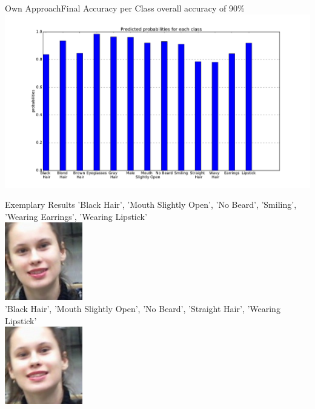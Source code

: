 \documentclass{beamer}
\begin{document}
\begin{frame}{Own Approach}{Final Accuracy per Class}
\centering
overall accuracy of 90\%
	\includegraphics[width=1.1\textwidth]{figures/accuracy_on_classes} 
\end{frame}

\begin{frame}{Exemplary Results}
\centering
'Black Hair', 'Mouth Slightly Open', 'No Beard', 'Smiling', 'Wearing Earrings', 'Wearing Lipstick' \\
\includegraphics[height=0.3\textheight]{figures/leti_normalised110} \\ 
'Black Hair', 'Mouth Slightly Open', 'No Beard', 'Straight Hair', 'Wearing Lipstick' \\
\includegraphics[height=0.3\textheight]{figures/leti_normalised111} 
\end{frame}
\end{document}
